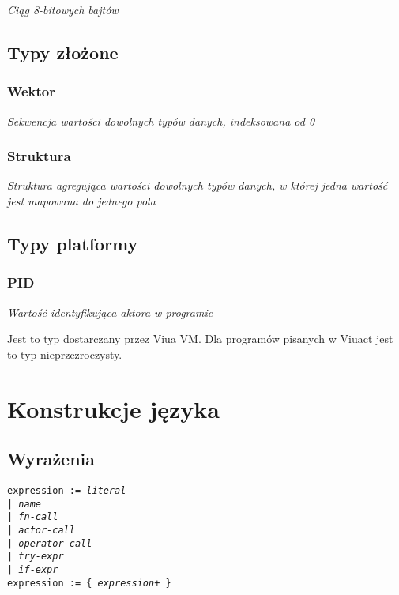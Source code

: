 \documentclass[11pt,oneside,a4paper,titlepage,onecolumn]{article}
\begin{document}
\emph{Ciąg 8-bitowych bajtów}

\subsection{Typy złożone}

\subsubsection{Wektor}

\emph{Sekwencja wartości dowolnych typów danych, indeksowana od 0}

\subsubsection{Struktura}

\emph{Struktura agregująca wartości dowolnych typów danych, w której jedna
wartość jest mapowana do jednego pola}

\subsection{Typy platformy}

\subsubsection{PID}

\emph{Wartość identyfikująca aktora w programie}

Jest to typ dostarczany przez Viua VM. Dla programów pisanych w Viuact jest to
typ nieprzezroczysty.

\newpage
\section{Konstrukcje języka}

\subsection{Wyrażenia}

\texttt{expression := \emph{literal} \\
\phantom{expression :}| \emph{name} \\
\phantom{expression :}| \emph{fn-call} \\
\phantom{expression :}| \emph{actor-call} \\
\phantom{expression :}| \emph{operator-call} \\
\phantom{expression :}| \emph{try-expr} \\
\phantom{expression :}| \emph{if-expr}}
\\
\texttt{expression := \{ \emph{expression}+ \}}
\end{document}
